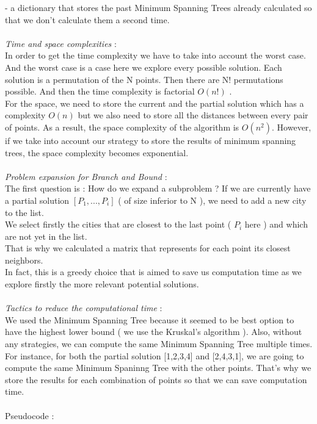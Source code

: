 \documentclass[12pt]{article}
\begin{document}
- a dictionary that stores the past Minimum Spanning Trees already calculated so that we don't calculate them a second time. \\
\\
\textit{Time and space complexities} : \\
In order to get the time complexity we have to take into account the worst case. And the worst case is a case here we explore every possible solution. Each solution is a permutation of the N points. Then there are N! permutations possible. And then the time complexity is factorial $O(n!)$ .\\
For the space, we need to store the current and the partial solution which has a complexity $O(n)$ but we also need to store all the distances between every pair of points. As a result, the space complexity of the algorithm is $O(n^2)$. However, if we take into account our strategy to store the results of minimum spanning trees, the space complexity becomes exponential.\\
\\
\textit{Problem expansion for Branch and Bound} : \\
The first question is : How do we expand a subproblem ? If we are currently have a partial solution $[P_1,...,P_i]$ ( of size inferior to N ), we need to add a new city to the list. \\
We select firstly the cities that are closest to the last point ( $P_i$ here ) and which are not yet in the list. \\
That is why we calculated a matrix that represents for each point its closest neighbors. \\
In fact, this is a greedy choice that is aimed to save us computation time as we explore firstly the more relevant potential solutions. \\
\\
\textit{Tactics to reduce the computational time} : \\
We used the Minimum Spanning Tree because it seemed to be best option to have the highest lower bound ( we use the Kruskal's algorithm ). Also, without any strategies, we can compute the same Minimum Spanning Tree multiple times. For instance, for both the partial solution [1,2,3,4] and [2,4,3,1], we are going to compute the same Minimum Spaninng Tree with the other points. That's why we store the results for each combination of points so that we can save computation time. \\
\\
Pseudocode : \\
\end{document}
